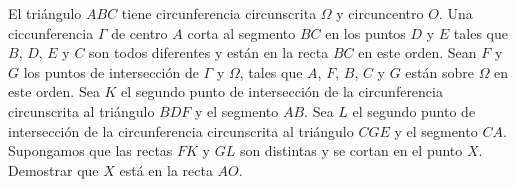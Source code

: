 El triángulo $ABC$ tiene circunferencia circunscrita $\Omega$ y circuncentro $O$. Una ciccunferencia $\Gamma$ de centro $A$ corta al segmento $BC$ en los puntos $D$ y $E$ tales que $B$, $D$, $E$ y $C$ son todos diferentes y están en la recta $BC$ en este orden. Sean $F$ y $G$ los puntos de intersección de $\Gamma$ y $\Omega$, tales que $A$, $F$, $B$, $C$ y $G$ están sobre $\Omega$ en este orden. Sea $K$ el segundo punto de intersección de la circunferencia circunscrita al triángulo $BDF$ y el segmento $AB$. Sea $L$ el segundo punto de intersección de la circunferencia circunscrita al triángulo $CGE$ y el segmento $CA$. \newline 
Supongamos que las rectas $FK$ y $GL$ son distintas y se cortan en el punto $X$. Demostrar que $X$ está en la recta $AO$.
